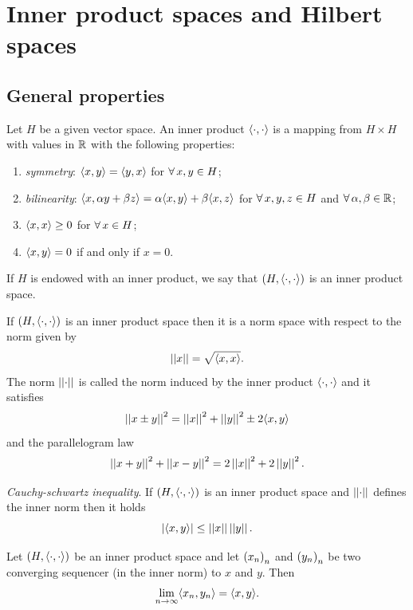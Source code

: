 \documentclass{article}
\begin{document}
\section{Inner product spaces and Hilbert spaces}
\subsection{General properties}
\begin{definition}
	Let $H$ be a given vector space. An inner product $\langle \cdot,\cdot \rangle$ is a mapping from $H\times H$ with values in $\mathbb{R}$ with the following properties:
	\begin{enumerate}
		\item \emph{symmetry}: $\langle x,y \rangle=\langle y,x \rangle$ for $\forall\, x,y\in H$;
		\item \emph{bilinearity}: $\langle x,\alpha y+\beta z \rangle=\alpha\langle x,y \rangle+\beta\langle x,z \rangle$ for $\forall\, x,y,z\in H$ and $\forall\,\alpha,\beta\in\mathbb{R}$;
		\item $\langle x,x \rangle\geq0$ for $\forall\, x\in H$;
		\item $\langle x,y \rangle=0$ if and only if $x=0$. 
	\end{enumerate}
	If $H$ is endowed with an inner product, we say that $\left(H,\langle \cdot,\cdot \rangle\right)$ is an inner product space.
\end{definition}
\begin{proposition}
	If $\left(H,\langle \cdot,\cdot \rangle\right)$ is an inner product space then it is a norm space with respect to the norm given by
	\begin{equation*}
		\left|\left|x\right|\right|=\sqrt{\langle x,x \rangle}.
	\end{equation*}
	The norm $\left|\left|\cdot\right|\right|$ is called the norm induced by the inner product $\langle \cdot,\cdot \rangle$ and it satisfies
	\begin{equation*}
		\left|\left|x\pm y\right|\right|^{2}=\left|\left|x\right|\right|^{2}+\left|\left|y\right|\right|^{2}\pm 2\langle x,y \rangle
	\end{equation*}
	and the parallelogram law
	\begin{equation*}
		\left|\left|x+y\right|\right|^{2}+\left|\left|x-y\right|\right|^{2}=2\left|\left|x\right|\right|^{2}+2\left|\left|y\right|\right|^{2}.
	\end{equation*}
\end{proposition}
\begin{proposition}
	\emph{Cauchy-schwartz inequality}. If $\left(H,\langle \cdot,\cdot \rangle\right)$ is an inner product space and $\left|\left|\cdot\right|\right|$ defines the inner norm then it holds
	\begin{equation*}
		\left|\langle x,y \rangle\right|\leq\left|\left|x\right|\right|\left|\left|y\right|\right|.
	\end{equation*}
\end{proposition}
\begin{proposition}
	Let $\left(H,\langle \cdot,\cdot \rangle\right)$ be an inner product space and let ${\left({x}_{n}\right)}_{n}$ and ${\left({y}_{n}\right)}_{n}$ be two converging sequencer (in the inner norm) to $x$ and $y$. Then
	\begin{equation*}
		\lim_{n\to\infty}\langle x_{n},y_{n} \rangle=\langle x,y \rangle.
	\end{equation*}
\end{proposition}
\end{document}

